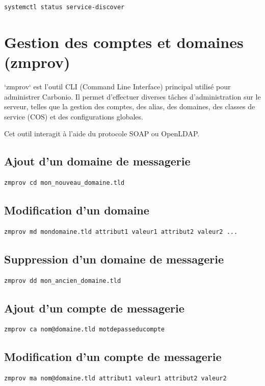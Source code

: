\documentclass[11pt,a4paper]{report}
\begin{document}
\begin{lstlisting}
systemctl status service-discover
\end{lstlisting}


\chapter{Gestion des comptes et domaines (zmprov)}

`zmprov` est l'outil CLI (Command Line Interface) principal utilisé pour administrer
Carbonio.\allowbreak{} Il permet d'effectuer diverses tâches d'administration sur le serveur, telles
que la gestion des comptes, des alias, des domaines, des classes de service (COS) et des
configurations globales.\allowbreak{}

Cet outil interagit à l'aide du protocole SOAP ou OpenLDAP.\allowbreak{}


\section{Ajout d'un domaine de messagerie}
\begin{lstlisting}
zmprov cd mon_nouveau_domaine.tld
\end{lstlisting}


\section{Modification d'un domaine}
\begin{lstlisting}
zmprov md mondomaine.tld attribut1 valeur1 attribut2 valeur2 ...
\end{lstlisting}


\section{Suppression d'un domaine de messagerie}
\begin{lstlisting}
zmprov dd mon_ancien_domaine.tld
\end{lstlisting}


\section{Ajout d'un compte de messagerie}
\begin{lstlisting}
zmprov ca nom@domaine.tld motdepasseducompte
\end{lstlisting}


\section{Modification d'un compte de messagerie}
\begin{lstlisting}
zmprov ma nom@domaine.tld attribut1 valeur1 attribut2 valeur2
\end{lstlisting}
\end{document}
